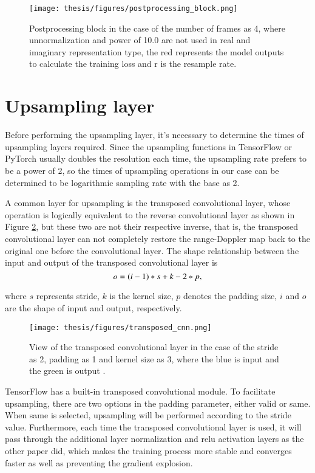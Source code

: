 \begin{figure}
	\centering
	\texttt{[image: thesis/figures/postprocessing\_block.png]}
	\caption{Postprocessing block in the case of the number of frames as 4, where unnormalization and power of 10.0 are not used in real and imaginary representation type, the red represents the model outputs to calculate the training loss and r is the resample rate.}
	\label{postprocessing_block}
\end{figure}

\section{Upsampling layer} \label{upsampling layer}
Before performing the upsampling layer, it's necessary to determine the times of upsampling layers required. Since the upsampling functions in TensorFlow or PyTorch usually doubles the resolution each time, the upsampling rate prefers to be a power of 2, so the times of upsampling operations in our case can be determined to be logarithmic sampling rate with the base as 2.

A common layer for upsampling is the transposed convolutional layer, whose operation is logically equivalent to the reverse convolutional layer as shown in Figure \ref{view of a transposed cnn layer}, but these two are not their respective inverse, that is, the transposed convolutional layer can not completely restore the range-Doppler map back to the original one before the convolutional layer. The shape relationship between the input and output of the transposed convolutional layer is
\begin{equation}
    \centering
    o = (i - 1) * s + k - 2 * p,
\end{equation}

where $s$ represents stride, $k$ is the kernel size, $p$ denotes the padding size, $i$ and $o$ are the shape of input and output, respectively.

\begin{figure}
	\centering
	\texttt{[image: thesis/figures/transposed\_cnn.png]}
	\caption{View of the transposed convolutional layer in the case of the stride as 2, padding as 1 and kernel size as 3, where the blue is input and the green is output \cite{vdumoulin_vdumoulinconv_arithmetic_2025}.}
	\label{view of a transposed cnn layer}
\end{figure}

TensorFlow has a built-in transposed convolutional module. To facilitate upsampling, there are two options in the padding parameter, either valid or same. When same is selected, upsampling will be performed according to the stride value. Furthermore, each time the transposed convolutional layer is used, it will pass through the additional layer normalization and \gls{relu} activation layers as the other paper \cite{hinderer_blind_2022} did, which makes the training process more stable and converges faster as well as preventing the gradient explosion.

